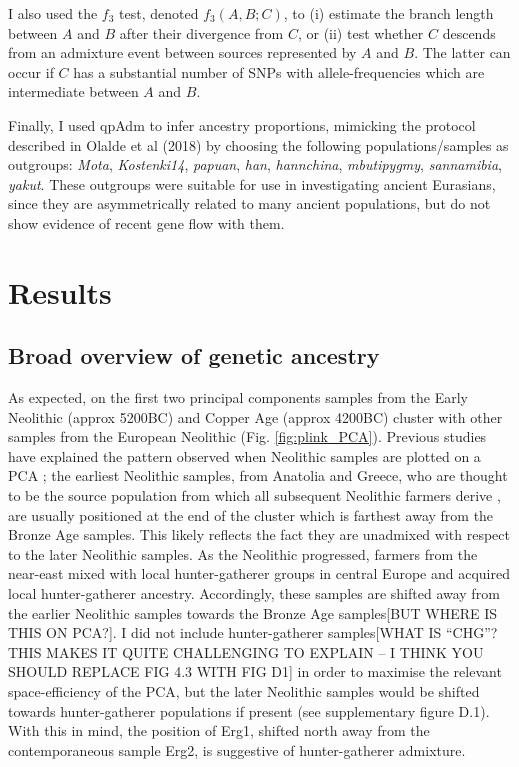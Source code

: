 I also used the $f_3$ test, denoted $f_{3}(A,B;C)$, to (i) estimate the branch length between $A$ and $B$ after their divergence from $C$, or (ii) test whether $C$ descends from an admixture event between sources represented by $A$ and $B$. The latter can occur if $C$ has a substantial number of SNPs with allele-frequencies which are intermediate between $A$ and $B$.

Finally, I used qpAdm to infer ancestry proportions, mimicking the protocol described in Olalde et al (2018) by choosing the following populations/samples as outgroups: \textit{Mota}, \textit{Kostenki14}, \textit{papuan}, \textit{han}, \textit{hannchina}, \textit{mbutipygmy}, \textit{sannamibia}, \textit{yakut}. These outgroups were suitable for use in investigating ancient Eurasians, since they are asymmetrically related to many ancient populations, but do not show evidence of recent gene flow with them. 

\section{Results}

\subsection{Broad overview of genetic ancestry}


As expected, on the first two principal components samples from the Early Neolithic (approx 5200BC) and Copper Age (approx 4200BC) cluster with other samples from the European Neolithic (Fig. \ref{fig:plink_PCA}). Previous studies have explained the pattern observed when Neolithic samples are plotted on a PCA \cite{Lipson2017b}; the earliest Neolithic samples, from Anatolia and Greece, who are thought to be the source population from which all subsequent Neolithic farmers derive \cite{Hofmanova2016, Haak2010, haak2005ancient, bramanti2009genetic, Lazaridis2014}, are usually positioned at the end of the cluster which is farthest away from the Bronze Age samples. This likely reflects the fact they are unadmixed with respect to the later Neolithic samples. As the Neolithic progressed, farmers from the near-east mixed with local hunter-gatherer groups in central Europe \cite{Lipson2017b} and acquired local hunter-gatherer ancestry. Accordingly, these samples are shifted away from the earlier Neolithic samples towards the Bronze Age samples{\color{red}[BUT WHERE IS THIS ON PCA?]}. I {\color{red}did not include hunter-gatherer samples[WHAT IS ``CHG''? THIS MAKES IT QUITE CHALLENGING TO EXPLAIN -- I THINK YOU SHOULD REPLACE FIG 4.3 WITH FIG D1]} in order to maximise the relevant space-efficiency of the PCA, but the later Neolithic samples would be shifted towards hunter-gatherer populations if present (see supplementary figure D.1). With this in mind, the position of Erg1, shifted north away from the contemporaneous sample Erg2, is suggestive of hunter-gatherer admixture. 

